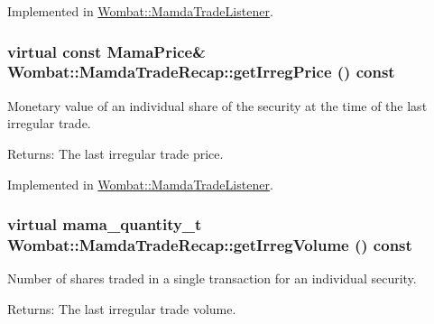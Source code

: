 Implemented in \hyperlink{classWombat_1_1MamdaTradeListener_e113087de67a4d24fae82add1dfdaba2}{Wombat::Mamda\-Trade\-Listener}.\hypertarget{classWombat_1_1MamdaTradeRecap_5d274713697f09773b0bf6c5c30c637d}{
\subsubsection[getIrregPrice]{\setlength{\rightskip}{0pt plus 5cm}virtual const Mama\-Price\& Wombat::Mamda\-Trade\-Recap::get\-Irreg\-Price () const}}
\label{classWombat_1_1MamdaTradeRecap_5d274713697f09773b0bf6c5c30c637d}


Monetary value of an individual share of the security at the time of the last irregular trade. 

\begin{Desc}
\item[Returns:]The last irregular trade price. \end{Desc}


Implemented in \hyperlink{classWombat_1_1MamdaTradeListener_95fdb22b7d58d3767d31a82ced35df77}{Wombat::Mamda\-Trade\-Listener}.\hypertarget{classWombat_1_1MamdaTradeRecap_b361bc0a511353d976e092fb7972018d}{
\subsubsection[getIrregVolume]{\setlength{\rightskip}{0pt plus 5cm}virtual mama\_\-quantity\_\-t Wombat::Mamda\-Trade\-Recap::get\-Irreg\-Volume () const}}
\label{classWombat_1_1MamdaTradeRecap_b361bc0a511353d976e092fb7972018d}


Number of shares traded in a single transaction for an individual security. 

\begin{Desc}
\item[Returns:]The last irregular trade volume. \end{Desc}


